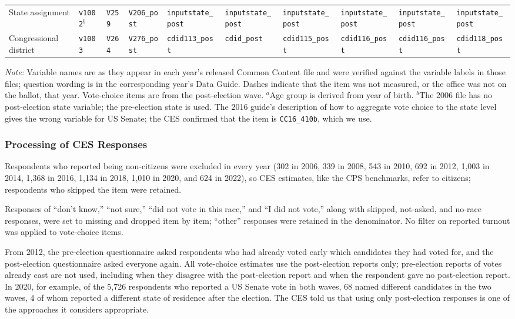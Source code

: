 \documentclass[12pt]{article}
\begin{document}
\begin{table}[htbp]
{\begin{tabular}{llllllllll}
State assignment & \texttt{v1002}$^b$ & \texttt{V259} & \texttt{V206\_post} & \texttt{inputstate\_post} & \texttt{inputstate\_post} & \texttt{inputstate\_post} & \texttt{inputstate\_post} & \texttt{inputstate\_post} & \texttt{inputstate\_post} \\
Congressional district & \texttt{v1003} & \texttt{V264} & \texttt{V276\_post} & \texttt{cdid113\_post} & \texttt{cdid\_post} & \texttt{cdid115\_post} & \texttt{cdid116\_post} & \texttt{cdid116\_post} & \texttt{cdid118\_post} \\
\bottomrule
\end{tabular}}
\par\smallskip
\begin{minipage}{\linewidth}\footnotesize
\textit{Note:} Variable names are as they appear in each year's released Common Content file and were verified against the variable labels in those files; question wording is in the corresponding year's Data Guide. Dashes indicate that the item was not measured, or the office was not on the ballot, that year. Vote-choice items are from the post-election wave. $^a$Age group is derived from year of birth. $^b$The 2006 file has no post-election state variable; the pre-election state is used. The 2016 guide's description of how to aggregate vote choice to the state level gives the wrong variable for US Senate; the CES confirmed that the item is \texttt{CC16\_410b}, which we use.
\end{minipage}
\end{table}

\subsubsection*{Processing of CES Responses}
Respondents who reported being non-citizens were excluded in every year (302 in 2006, 339 in 2008, 543 in 2010, 692 in 2012, 1,003 in 2014, 1,368 in 2016, 1,134 in 2018, 1,010 in 2020, and 624 in 2022), so CES estimates, like the CPS benchmarks, refer to citizens; respondents who skipped the item were retained.

Responses of ``don't know,'' ``not sure,'' ``did not vote in this race,'' and ``I did not vote,'' along with skipped, not-asked, and no-race responses, were set to missing and dropped item by item; ``other'' responses were retained in the denominator. No filter on reported turnout was applied to vote-choice items.

From 2012, the pre-election questionnaire asked respondents who had already voted early which candidates they had voted for, and the post-election questionnaire asked everyone again. All vote-choice estimates use the post-election reports only; pre-election reports of votes already cast are not used, including when they disagree with the post-election report and when the respondent gave no post-election report. In 2020, for example, of the 5,726 respondents who reported a US Senate vote in both waves, 68 named different candidates in the two waves, 4 of whom reported a different state of residence after the election. The CES told us that using only post-election responses is one of the approaches it considers appropriate.
\end{document}
